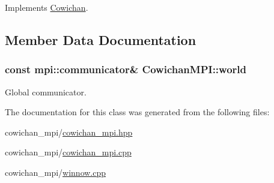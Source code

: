 Implements \hyperlink{class_cowichan_13d60e06ced3b5da79d62c133ce82337}{Cowichan}.

\subsection{Member Data Documentation}
\hypertarget{class_cowichan_m_p_i_cf8ae701dfbb7c17dcec165800c16969}{
\subsubsection[{world}]{\setlength{\rightskip}{0pt plus 5cm}const mpi::communicator\& {\bf CowichanMPI::world}}}
\label{class_cowichan_m_p_i_cf8ae701dfbb7c17dcec165800c16969}


Global communicator. 

The documentation for this class was generated from the following files:\begin{CompactItemize}
\item 
cowichan\_\-mpi/\hyperlink{cowichan__mpi_8hpp}{cowichan\_\-mpi.hpp}\item 
cowichan\_\-mpi/\hyperlink{cowichan__mpi_8cpp}{cowichan\_\-mpi.cpp}\item 
cowichan\_\-mpi/\hyperlink{cowichan__mpi_2winnow_8cpp}{winnow.cpp}\end{CompactItemize}

